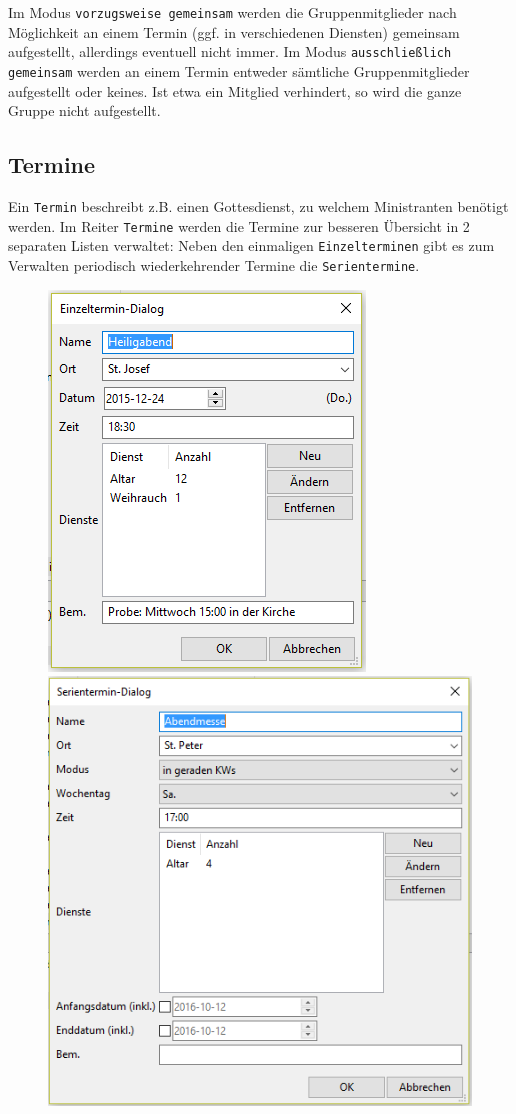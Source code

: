 \documentclass[a4paper,11pt]{article}
\begin{document}
Im Modus \texttt{vorzugsweise gemeinsam} werden die Gruppenmitglieder nach Möglichkeit an einem Termin (ggf. in verschiedenen Diensten) gemeinsam aufgestellt, allerdings eventuell nicht immer. Im Modus \texttt{ausschließlich gemeinsam} werden an einem Termin entweder sämtliche Gruppenmitglieder aufgestellt oder keines. Ist etwa ein Mitglied verhindert, so wird die ganze Gruppe nicht aufgestellt.
\subsection{Termine}
Ein \texttt{Termin} beschreibt z.B. einen Gottesdienst, zu welchem Ministranten benötigt werden. Im Reiter \texttt{Termine} werden die Termine zur besseren Übersicht in 2 separaten Listen verwaltet: Neben den einmaligen \texttt{Einzelterminen} gibt es zum Verwalten periodisch wiederkehrender Termine die \texttt{Serientermine}.
\begin{figure}[h]
\includegraphics[scale=0.55]{einzel2.PNG}
\includegraphics[scale=0.55]{serie2.PNG}
\end{figure}
\end{document}
